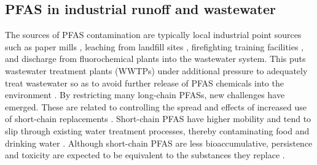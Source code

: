 \subsection{PFAS in industrial runoff and wastewater}
The sources of PFAS contamination are typically local industrial point sources such as paper mills \citep{lee2020legacy,langberg2021paper}, leaching from landfill sites \citep{masoner2020landfill}, firefighting training facilities \citep{filipovic2015historical}, and discharge from fluorochemical plants \citep{gebbink2017presence} into the wastewater system. This puts wastewater treatment plants (\acrshort{WWTPs}) under additional pressure to adequately treat wastewater so as to avoid further release of PFAS chemicals into the environment \citep{Morin2017flameWaste}. By restricting many long-chain PFASs, new challenges have emerged. These are related to controlling the spread and effects of increased use of short-chain replacements \citep{knutsen2019leachate}. Short-chain PFAS have higher mobility and tend to slip through existing water treatment processes, thereby contaminating food and drinking water \citep{hale2020persistent,brendel2018short}. Although short-chain PFAS are less bioaccumulative, persistence and toxicity are expected to be equivalent to the substances they replace \citep{EC2020PFAS}. 


